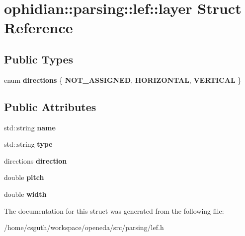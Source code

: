 \hypertarget{structophidian_1_1parsing_1_1lef_1_1layer}{\section{ophidian\-:\-:parsing\-:\-:lef\-:\-:layer Struct Reference}
\label{structophidian_1_1parsing_1_1lef_1_1layer}
}
\subsection*{Public Types}
\begin{DoxyCompactItemize}
\item 
enum {\bfseries directions} \{ {\bfseries N\-O\-T\-\_\-\-A\-S\-S\-I\-G\-N\-E\-D}, 
{\bfseries H\-O\-R\-I\-Z\-O\-N\-T\-A\-L}, 
{\bfseries V\-E\-R\-T\-I\-C\-A\-L}
 \}
\end{DoxyCompactItemize}
\subsection*{Public Attributes}
\begin{DoxyCompactItemize}
\item 
\hypertarget{structophidian_1_1parsing_1_1lef_1_1layer_ad5eb28932e40f62a6fad603f3d9fdf95}{std\-::string {\bfseries name}}\label{structophidian_1_1parsing_1_1lef_1_1layer_ad5eb28932e40f62a6fad603f3d9fdf95}

\item 
\hypertarget{structophidian_1_1parsing_1_1lef_1_1layer_a4207052d4b5bd6e7e2befd346ad7580a}{std\-::string {\bfseries type}}\label{structophidian_1_1parsing_1_1lef_1_1layer_a4207052d4b5bd6e7e2befd346ad7580a}

\item 
\hypertarget{structophidian_1_1parsing_1_1lef_1_1layer_a29b20b9f1870a276f4657165e815ad87}{directions {\bfseries direction}}\label{structophidian_1_1parsing_1_1lef_1_1layer_a29b20b9f1870a276f4657165e815ad87}

\item 
\hypertarget{structophidian_1_1parsing_1_1lef_1_1layer_a2b3709123ab33a232e5d646400717dd5}{double {\bfseries pitch}}\label{structophidian_1_1parsing_1_1lef_1_1layer_a2b3709123ab33a232e5d646400717dd5}

\item 
\hypertarget{structophidian_1_1parsing_1_1lef_1_1layer_ad204309a84208aaa65756b2b3e912487}{double {\bfseries width}}\label{structophidian_1_1parsing_1_1lef_1_1layer_ad204309a84208aaa65756b2b3e912487}

\end{DoxyCompactItemize}


The documentation for this struct was generated from the following file\-:\begin{DoxyCompactItemize}
\item 
/home/csguth/workspace/openeda/src/parsing/lef.\-h\end{DoxyCompactItemize}
